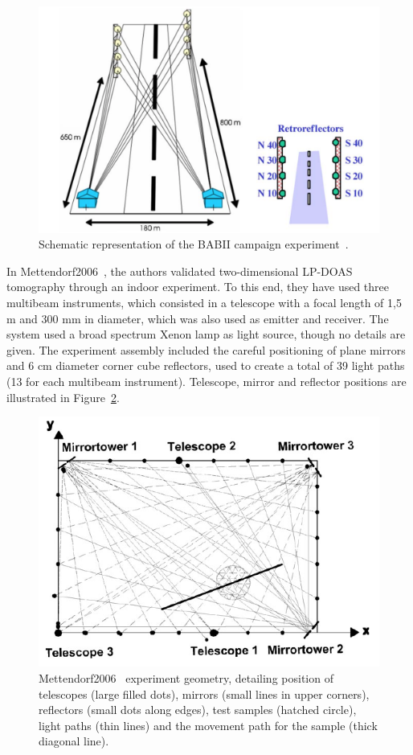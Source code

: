 \begin{figure}[htb]
    \centering
    \includegraphics[width=0.8\linewidth]{img/babii_geometry.png}
    \caption{Schematic representation of the BABII campaign
    experiment~\cite{Pundt2005}.}\label{fig:babii_geometry}
\end{figure}

In Mettendorf2006~\cite{Mettendorf2006}, the authors validated
two-dimensional LP-DOAS tomography through an indoor experiment. To this
end, they have used three multibeam instruments, which consisted in a
telescope with a focal length of 1,5 m and 300 mm in diameter, which was
also used as emitter and receiver. The system used a broad spectrum
Xenon lamp as light source, though no details are given. The experiment
assembly included the careful positioning of plane mirrors and 6 cm
diameter corner cube reflectors, used to create a total of 39 light
paths (13 for each multibeam instrument). Telescope, mirror and
reflector positions are illustrated in Figure~\ref{fig:mettendorf_geom}.

\begin{figure}[htb]
    \centering
    \includegraphics[width=0.8\linewidth]{img/mettendorf.png}
    \caption{Mettendorf2006~\cite{Mettendorf2006} experiment geometry,
    detailing position of telescopes (large filled dots), mirrors (small
lines in upper corners), reflectors (small dots along edges), test
samples (hatched circle), light paths (thin lines) and the movement path
for the sample (thick diagonal line).}\label{fig:mettendorf_geom}
\end{figure}

